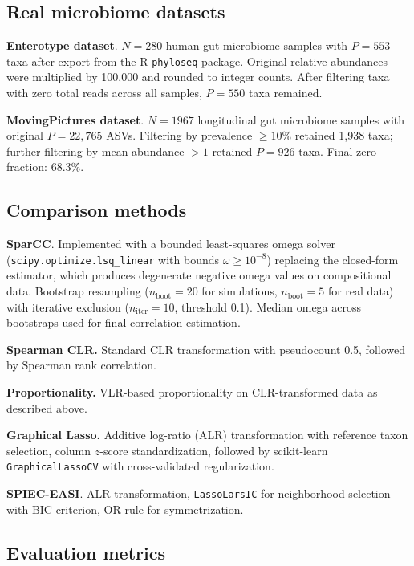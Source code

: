 \documentclass[fleqn]{nature}
\begin{document}
\begin{methods}
\subsection*{Real microbiome datasets}

\textbf{Enterotype dataset}\cite{arumugam2011}.
$N = 280$ human gut microbiome samples with $P = 553$ taxa after export from the R \texttt{phyloseq} package.
Original relative abundances were multiplied by 100{,}000 and rounded to integer counts.
After filtering taxa with zero total reads across all samples, $P = 550$ taxa remained.

\textbf{MovingPictures dataset}\cite{caporaso2011}.
$N = 1967$ longitudinal gut microbiome samples with original $P = 22{,}765$ ASVs.
Filtering by prevalence $\geq 10\%$ retained 1{,}938 taxa; further filtering by mean abundance $> 1$ retained $P = 926$ taxa.
Final zero fraction: 68.3\%.


\subsection*{Comparison methods}

\textbf{SparCC}\cite{friedman2012}.
Implemented with a bounded least-squares omega solver (\texttt{scipy.optimize.lsq\_linear} with bounds $\omega \geq 10^{-8}$) replacing the closed-form estimator, which produces degenerate negative omega values on compositional data.
Bootstrap resampling ($n_{\text{boot}} = 20$ for simulations, $n_{\text{boot}} = 5$ for real data) with iterative exclusion ($n_{\text{iter}} = 10$, threshold 0.1).
Median omega across bootstraps used for final correlation estimation.

\textbf{Spearman CLR.}
Standard CLR transformation with pseudocount 0.5, followed by Spearman rank correlation.

\textbf{Proportionality.}
VLR-based proportionality on CLR-transformed data as described above.

\textbf{Graphical Lasso.}
Additive log-ratio (ALR) transformation with reference taxon selection, column $z$-score standardization, followed by scikit-learn \texttt{GraphicalLassoCV} with cross-validated regularization.

\textbf{SPIEC-EASI}\cite{kurtz2015}.
ALR transformation, \texttt{LassoLarsIC} for neighborhood selection with BIC criterion, OR rule for symmetrization.


\subsection*{Evaluation metrics}


\end{methods}
\end{document}
